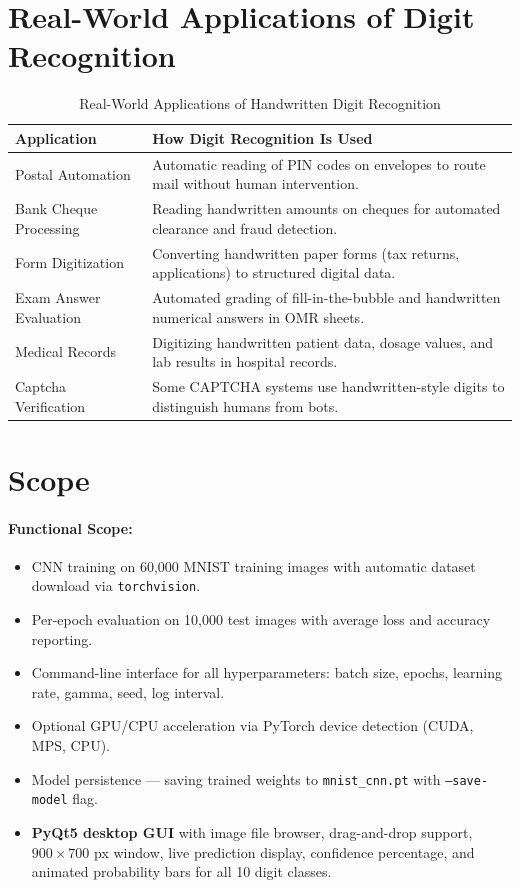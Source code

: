 \documentclass[12pt,a4paper,openany]{report}
\begin{document}
\section{Real-World Applications of Digit Recognition}

\begin{table}[H]
\centering
\begin{tabular}{|l|p{9.5cm}|}
\hline
\textbf{Application} & \textbf{How Digit Recognition Is Used} \\
\hline
Postal Automation      & Automatic reading of PIN codes on envelopes to route mail without human intervention. \\
Bank Cheque Processing & Reading handwritten amounts on cheques for automated clearance and fraud detection. \\
Form Digitization      & Converting handwritten paper forms (tax returns, applications) to structured digital data. \\
Exam Answer Evaluation & Automated grading of fill-in-the-bubble and handwritten numerical answers in OMR sheets. \\
Medical Records        & Digitizing handwritten patient data, dosage values, and lab results in hospital records. \\
Captcha Verification   & Some CAPTCHA systems use handwritten-style digits to distinguish humans from bots. \\
\hline
\end{tabular}
\caption{Real-World Applications of Handwritten Digit Recognition}
\end{table}

\section{Scope}

\paragraph{Functional Scope:}
\begin{itemize}
    \item CNN training on 60,000 MNIST training images with automatic dataset download via \texttt{torchvision}.
    \item Per-epoch evaluation on 10,000 test images with average loss and accuracy reporting.
    \item Command-line interface for all hyperparameters: batch size, epochs, learning rate, gamma, seed, log interval.
    \item Optional GPU/CPU acceleration via PyTorch device detection (CUDA, MPS, CPU).
    \item Model persistence --- saving trained weights to \texttt{mnist\_cnn.pt} with \texttt{--save-model} flag.
    \item \textbf{PyQt5 desktop GUI} with image file browser, drag-and-drop support, $900 \times 700$ px window, live prediction display, confidence percentage, and animated probability bars for all 10 digit classes.
\end{itemize}
\end{document}
